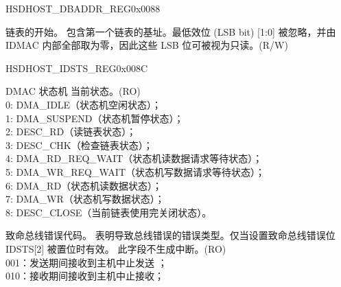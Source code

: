 \begin{register}{H}{SDHOST\_DBADDR\_REG}{0x{}0088}\label{regdesc:DBADDRREG}
%
\regnewline%
\begin{regdesc}\begin{reglist}
\item [SDHOST\_DBADDR\_REG] 链表的开始。 包含第一个链表的基址。最低效位 (LSB bit) [1:0] 被忽略，并由 IDMAC 内部全部取为零，因此这些 LSB 位可被视为只读。(R/W)
\end{reglist}\end{regdesc}
\end{register}


\begin{register}{H}{SDHOST\_IDSTS\_REG}{0x{}008C}\label{regdesc:IDSTSREG}
%
%
%
%
%
%
%
%
%
%
%
%
\regnewline%
\begin{regdesc}\begin{reglist}
\item [SDHOST\_IDSTS\_FSM]DMAC 状态机 当前状态。(RO)\\
0: DMA\_IDLE（状态机空闲状态）；\\
1: DMA\_SUSPEND（状态机暂停状态）；\\
2: DESC\_RD（读链表状态）；\\
3: DESC\_CHK（检查链表状态）；\\
4: DMA\_RD\_REQ\_WAIT（状态机读数据请求等待状态）；\\
5: DMA\_WR\_REQ\_WAIT（状态机写数据请求等待状态）；\\
6: DMA\_RD（状态机读数据状态）； \\
7: DMA\_WR（状态机写数据状态）； \\
8: DESC\_CLOSE（当前链表使用完关闭状态）。
\item [SDHOST\_IDSTS\_FBE\_CODE] 致命总线错误代码。 表明导致总线错误的错误类型。仅当设置致命总线错误位 IDSTS[2] 被置位时有效。 此字段不生成中断。(RO)\\
001：发送期间接收到主机中止发送 ；\\
010：接收期间接收到主机中止接收；\\

\end{reglist}
\end{regdesc}
\end{register}

